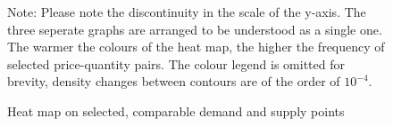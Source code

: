\begin{figure}[!ht]
\begin{center}
\caption{Heat map on selected, comparable demand and supply points}
\label{g10el}
\end{center}
{ \small Note: Please note the discontinuity in the scale of the y-axis. The three seperate graphs are arranged to be understood as a single one. The warmer the colours of the heat map, the higher the frequency of selected price-quantity pairs. The colour legend is omitted for brevity, density changes between contours are of the order of $10^{-4}$.} 
\end{figure}


